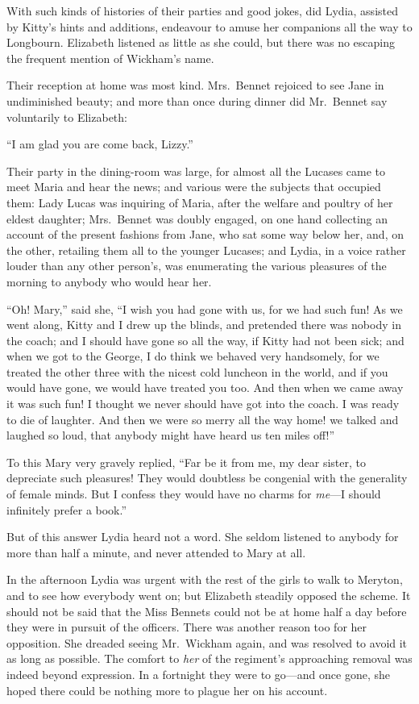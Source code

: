 With such kinds of histories of their parties and good jokes, did
Lydia, assisted by Kitty's hints and additions, endeavour to
amuse her companions all the way to Longbourn.  Elizabeth
listened as little as she could, but there was no escaping the
frequent mention of Wickham's name.

Their reception at home was most kind.  Mrs.\ Bennet rejoiced to
see Jane in undiminished beauty; and more than once during
dinner did Mr.\ Bennet say voluntarily to Elizabeth:

``I am glad you are come back, Lizzy.''

Their party in the dining-room was large, for almost all the
Lucases came to meet Maria and hear the news; and various
were the subjects that occupied them: Lady Lucas was inquiring
of Maria, after the welfare and poultry of her eldest daughter;
Mrs.\ Bennet was doubly engaged, on one hand collecting an
account of the present fashions from Jane, who sat some way
below her, and, on the other, retailing them all to the younger
Lucases; and Lydia, in a voice rather louder than any other
person's, was enumerating the various pleasures of the morning
to anybody who would hear her.

``Oh! Mary,'' said she, ``I wish you had gone with us, for we had
such fun!  As we went along, Kitty and I drew up the blinds,
and pretended there was nobody in the coach; and I should have
gone so all the way, if Kitty had not been sick; and when we got
to the George, I do think we behaved very handsomely, for we
treated the other three with the nicest cold luncheon in the
world, and if you would have gone, we would have treated you
too.  And then when we came away it was such fun!  I thought
we never should have got into the coach.  I was ready to die
of laughter.  And then we were so merry all the way home! we
talked and laughed so loud, that anybody might have heard us
ten miles off!''

To this Mary very gravely replied, ``Far be it from me, my dear
sister, to depreciate such pleasures!  They would doubtless be
congenial with the generality of female minds.  But I confess
they would have no charms for \emph{me}---I should infinitely prefer a
book.''

But of this answer Lydia heard not a word.  She seldom listened
to anybody for more than half a minute, and never attended to
Mary at all.

In the afternoon Lydia was urgent with the rest of the girls
to walk to Meryton, and to see how everybody went on; but
Elizabeth steadily opposed the scheme.  It should not be said
that the Miss Bennets could not be at home half a day before
they were in pursuit of the officers.  There was another reason
too for her opposition.  She dreaded seeing Mr.\ Wickham again,
and was resolved to avoid it as long as possible.  The comfort
to \emph{her} of the regiment's approaching removal was indeed beyond
expression.  In a fortnight they were to go---and once gone, she
hoped there could be nothing more to plague her on his account.


